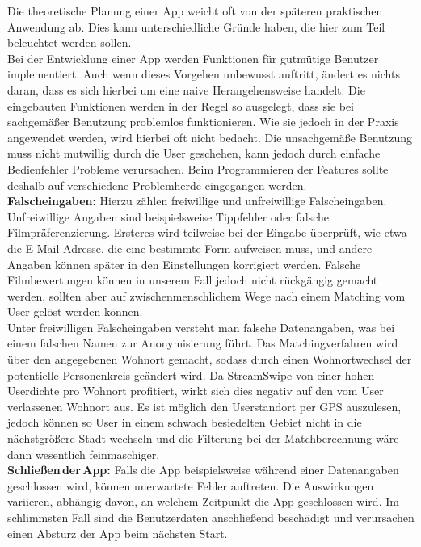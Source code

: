 Die theoretische Planung einer App weicht oft von der späteren praktischen Anwendung ab. Dies kann unterschiedliche Gründe haben, die hier zum Teil beleuchtet werden sollen.\\

\noindent
Bei der Entwicklung einer App werden Funktionen für gutmütige Benutzer implementiert. Auch wenn dieses Vorgehen unbewusst auftritt, ändert es nichts daran, dass es sich hierbei um eine naive Herangehensweise handelt. Die eingebauten Funktionen werden in der Regel so ausgelegt, dass sie bei sachgemäßer Benutzung problemlos funktionieren. Wie sie jedoch  in der Praxis angewendet werden, wird hierbei oft nicht bedacht. Die unsachgemäße Benutzung muss nicht mutwillig durch die User geschehen, kann jedoch durch einfache Bedienfehler Probleme verursachen. Beim Programmieren der Features sollte deshalb auf verschiedene Problemherde eingegangen werden.\\

\noindent
{}
\textbf{Falscheingaben:} Hierzu zählen freiwillige und unfreiwillige Falscheingaben. Unfreiwillige Angaben sind beispielsweise Tippfehler oder falsche Filmpräferenzierung. Ersteres wird teilweise bei der Eingabe überprüft, wie etwa die E-Mail-Adresse, die eine bestimmte Form aufweisen muss, und andere Angaben können später in den Einstellungen korrigiert werden. Falsche Filmbewertungen können in unserem Fall jedoch nicht rückgängig gemacht werden, sollten aber auf zwischenmenschlichem Wege nach einem Matching vom User gelöst werden können.\\
Unter freiwilligen Falscheingaben versteht man falsche Datenangaben, was bei einem falschen Namen zur Anonymisierung führt. Das Matchingverfahren wird über den angegebenen Wohnort gemacht, sodass durch einen Wohnortwechsel der potentielle Personenkreis geändert wird. Da StreamSwipe von einer hohen Userdichte pro Wohnort profitiert, wirkt sich dies negativ auf den vom User verlassenen Wohnort aus. Es ist möglich den Userstandort per GPS auszulesen, jedoch können so User in einem schwach besiedelten Gebiet nicht in die nächstgrößere Stadt wechseln und die Filterung bei der Matchberechnung wäre dann wesentlich feinmaschiger.\\

\noindent
{}
\textbf{Schließen\,der\,App:} Falls die App beispielsweise während einer Datenangaben geschlossen wird, können unerwartete Fehler auftreten. Die Auswirkungen  variieren,  abhängig davon, an welchem Zeitpunkt die App geschlossen wird. Im schlimmsten Fall sind die Benutzerdaten anschließend beschädigt und verursachen einen Absturz der App beim nächsten Start.\\

